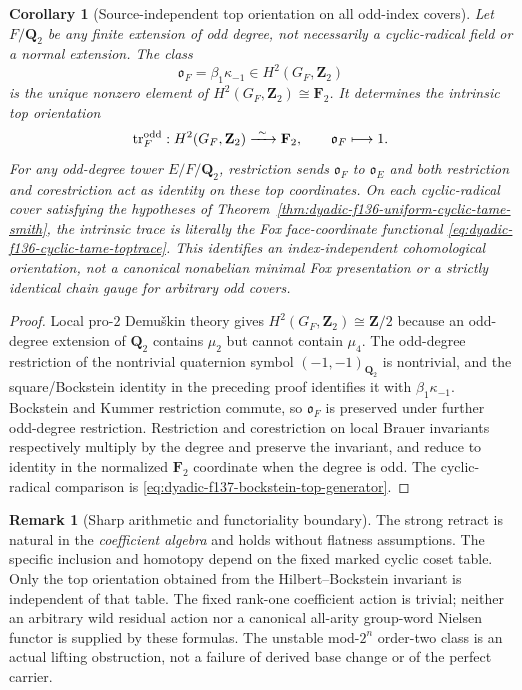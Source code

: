 \documentclass[11pt]{article}
\newtheorem{corollary}[theorem]{Corollary}
\theoremstyle{definition}
\newtheorem{remark}[theorem]{Remark}
\begin{document}
\begin{corollary}[Source-independent top orientation on all odd-index covers]
\label{cor:dyadic-f137-odd-cover-top-orientation}
Let $F/\mathbf Q_2$ be \emph{any} finite extension
of odd degree, not necessarily a cyclic-radical
field or a normal extension.  The class
\[
\mathfrak o_F=\beta_1\kappa_{-1}
\in H^2(G_F,\mathbf Z_2)
\]
is the unique nonzero element of
$H^2(G_F,\mathbf Z_2)\cong\mathbf F_2$.
It determines the intrinsic top orientation
\[
\operatorname{tr}^{\rm odd}_F:
H^2(G_F,\mathbf Z_2)\xrightarrow{\ \sim\ }\mathbf F_2,
\qquad
\mathfrak o_F\longmapsto1.
\]
For any odd-degree tower $E/F/\mathbf Q_2$,
restriction sends $\mathfrak o_F$
to $\mathfrak o_E$ and both restriction
and corestriction act as identity on
these top coordinates.  On each cyclic-radical
cover satisfying the hypotheses of
Theorem~\ref{thm:dyadic-f136-uniform-cyclic-tame-smith},
the intrinsic trace is \emph{literally}
the Fox face-coordinate functional
\eqref{eq:dyadic-f136-cyclic-tame-toptrace}.
This identifies an index-independent
\emph{cohomological orientation}, not
a canonical nonabelian minimal Fox
presentation or a strictly identical
chain gauge for arbitrary odd covers.
\end{corollary}

\begin{proof}
Local pro-$2$ Demu\v{s}kin theory gives
$H^2(G_F,\mathbf Z_2)\cong\mathbf Z/2$
because an odd-degree extension of
$\mathbf Q_2$ contains $\mu_2$
but cannot contain $\mu_4$.
The odd-degree restriction of the
nontrivial quaternion symbol
$(-1,-1)_{\mathbf Q_2}$
is nontrivial, and the square/Bockstein
identity in the preceding proof identifies
it with $\beta_1\kappa_{-1}$.
Bockstein and Kummer restriction commute,
so $\mathfrak o_F$ is preserved under
further odd-degree restriction.
Restriction and corestriction on
local Brauer invariants respectively
multiply by the degree and preserve
the invariant, and reduce to identity
in the normalized $\mathbf F_2$
coordinate when the degree is odd.
The cyclic-radical comparison is
\eqref{eq:dyadic-f137-bockstein-top-generator}.
\end{proof}

\begin{remark}[Sharp arithmetic and functoriality boundary]
\label{rem:dyadic-f137-scope}
The strong retract is natural in the
\emph{coefficient algebra} and holds
without flatness assumptions.  The
specific inclusion and homotopy depend
on the fixed marked cyclic coset table.
Only the top orientation obtained from
the Hilbert--Bockstein invariant is
independent of that table.  The fixed
rank-one coefficient action is trivial;
neither an arbitrary wild residual action
nor a canonical all-arity group-word
Nielsen functor is supplied by these
formulas.  The unstable mod-$2^n$
order-two class is an actual lifting
obstruction, not a failure of derived
base change or of the perfect carrier.
\end{remark}
\end{document}
